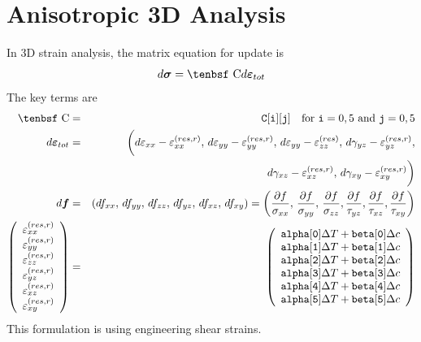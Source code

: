 \documentclass[11pt]{book}
\renewcommand{\vec}[1]{\boldsymbol{#1}}
\def\C{\hbox{\tenbsf C}}
\def\code#1{{\small\tt #1}}
\def\deff{d \vec{\varepsilon}_{tot}}
\def\df{d \vec{f}}
\def\dsig{d \vec{\sigma}}
\def\DT{\Delta T}
\def\e#1{\varepsilon_{#1}}
\def\er#1{\varepsilon_{#1}^{(res)}}
\def\err#1{\varepsilon_{#1}^{(res,r)}}
\def\g#1{\gamma_{#1}}
\begin{document}
\section{Anisotropic 3D Analysis}

In 3D strain analysis, the matrix equation for update is
\begin{equation}
    \dsig = \C \deff 
\end{equation}
The key terms are
\begin{eqnarray}
      \C & = & \code{C[i][j]} \quad {\rm for\ }\code{i}=0,5\ {\rm and\ }\code{j}=0,5 \\
       \deff & = & \biggl(d\e{xx} - \err{xx}, \thinspace d\e{yy} - \err{yy}, \thinspace  d\e{yy}-  \er{zz}, 
             \thinspace d\g{yz}-\err{yz},  \nonumber\\
             && \qquad\mbox{} \thinspace d\g{xz}-\err{xz},  \thinspace d\g{xy}-\err{xy}\biggr) \\
      \df & = & (df_{xx}, \thinspace df_{yy}, \thinspace df_{zz}, \thinspace df_{yz}, \thinspace df_{xz}, \thinspace df_{xy})
                  = \left({\partial f\over \sigma_{xx}}, \thinspace {\partial f\over \sigma_{yy}}, \thinspace {\partial f\over \sigma_{zz}},
                                {\partial f\over \tau_{yz}}, {\partial f\over \tau_{xz}}, {\partial f\over \tau_{xy}}\right)  \\
\left(\begin{array}{c} \err{xx} \\ \err{yy} \\ \err{zz} \\  \err{yz} \\ \err{xz} \\ \err{xy} \end{array}\right)
       & = &  \left(\begin{array}{c}
	\code{alpha[0]}\DT + \code{beta[0]}\Delta c \\
	\code{alpha[1]}\DT + \code{beta[1]}\Delta c \\
	\code{alpha[2]}\DT + \code{beta[2]}\Delta c \\
	\code{alpha[3]}\DT + \code{beta[3]}\Delta c \\
	\code{alpha[4]}\DT + \code{beta[4]}\Delta c \\
	\code{alpha[5]}\DT + \code{beta[5]}\Delta c 
 \end{array}\right) 
 \end{eqnarray}
This formulation is using engineering shear strains. 
 
\end{document}

